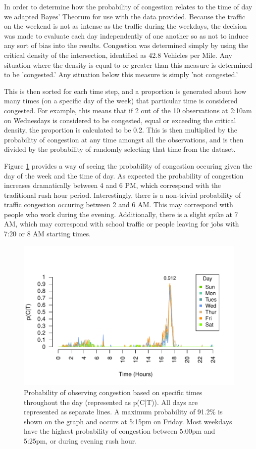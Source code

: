 \documentclass{report}
\begin{document}
In order to determine how the probability of congestion relates to the time of day we adapted Bayes' Theorum for use with the data provided. Because the traffic on the weekend is not as intense as the traffic during the weekdays, the decision was made to evaluate each day independently of one another so as not to induce any sort of bias into the results. Congestion was determined simply by using the critical density of the intersection, identified as 42.8 Vehicles per Mile. Any situation where the density is equal to or greater than this measure is determined to be 'congested.' Any situation below this measure is simply 'not congested.'

This is then sorted for each time step, and a proportion is generated about how many times (on a specific day of the week) that particular time is considered congested. For example, this means that if 2 out of the 10 observations at 2:10am on Wednesdays is considered to be congested, equal or exceeding the critical density, the proportion is calculated to be 0.2. This is then multiplied by the probability of congestion at any time amongst all the observations, and is then divided by the probability of randomly selecting that time from the dataset.

Figure \ref{fig:bayesplot} provides a way of seeing the probability of congestion
occuring given the day of the week and the time of day. As expected the probability
of congestion increases dramatically between 4 and 6 PM, which correspond with the
traditional rush hour period. Interestingly, there is a non-trivial probability of
traffic congestion occuring between 2 and 6 AM. This may correspond with people
who work during the evening. Additionally, there is a slight spike at 7 AM, which
may correspond with school traffic or people leaving for jobs with 7:20 or 8 AM
starting times.

\begin{figure}[h] \label{fig:bayesplot}
\centering
\includegraphics{upstat_report-bayesplot}
\caption{Probability of observing congestion based on specific times throughout the day (represented as p(C|T)). All days are represented as separate lines. A maximum probability of 91.2\% is shown on the graph and occurs at 5:15pm on Friday. Most weekdays have the highest probability of congestion between 5:00pm and 5:25pm, or during evening rush hour.}
\end{figure}
\end{document}
